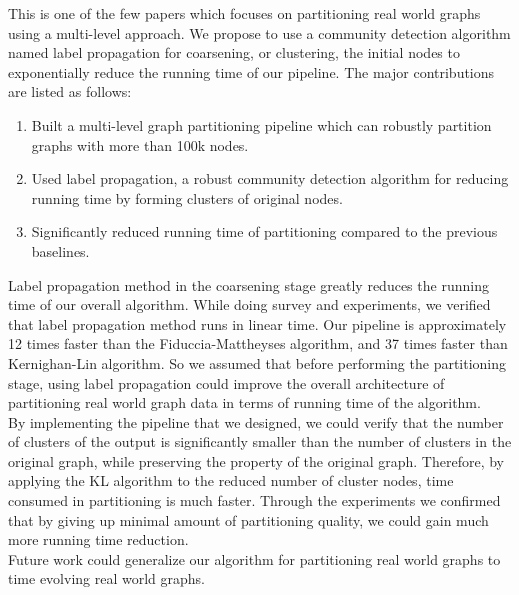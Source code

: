 This is one of the few papers which focuses on partitioning real world graphs using a multi-level approach. We propose to use a community detection algorithm named label propagation for coarsening, or clustering, the initial nodes to exponentially reduce the running time of our pipeline. The major contributions are listed as follows: 
\begin{enumerate}
  \item Built a multi-level graph partitioning pipeline which can robustly partition graphs with more than 100k nodes.
  \item Used label propagation, a robust community detection algorithm for reducing running time by forming clusters of original nodes. 
  \item Significantly reduced running time of partitioning compared to the previous baselines. 
\end{enumerate}
Label propagation method in the coarsening stage greatly reduces the running time of our overall algorithm. While doing survey and experiments, we verified that label propagation method runs in linear time. Our pipeline is approximately 12 times faster than the Fiduccia-Mattheyses algorithm, and 37 times faster than Kernighan-Lin algorithm. So we assumed that before performing the partitioning stage, using label propagation could improve the overall architecture of partitioning real world graph data in terms of running time of the algorithm. \\ 
By implementing the pipeline that we designed, we could verify that the number of clusters of the output is significantly smaller than the number of clusters in the original graph, while preserving the property of the original graph. Therefore, by applying the KL algorithm to the reduced number of cluster nodes, time consumed in partitioning is much faster. Through the experiments we confirmed that by giving up minimal amount of partitioning quality, we could gain much more running time reduction.\\
Future work could generalize our algorithm for partitioning real world graphs to time evolving real world graphs. 